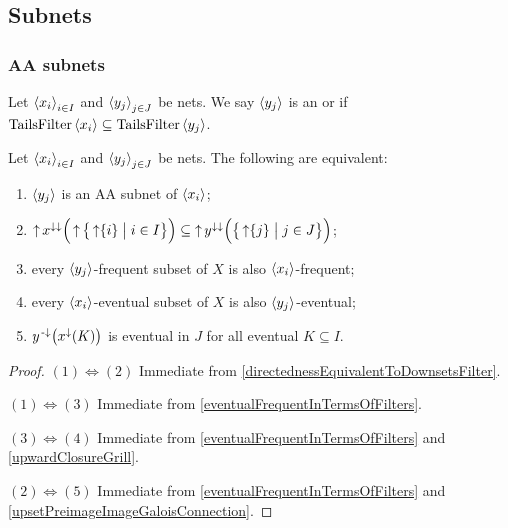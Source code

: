 \subsection{Subnets}
\subsubsection{AA subnets}
\begin{definition}
Let $\left\langle x_i \right\rangle_{i\in I}$ and $\left\langle y_j \right\rangle_{j\in J}$ be nets. We say $\left\langle y_j \right\rangle$ is an  or  if $\operatorname{TailsFilter}\left\langle x_i \right\rangle \subseteq \operatorname{TailsFilter}\left\langle y_j \right\rangle$.
\end{definition}

\begin{lemma} \label{AAsubnetEquivalents}
Let $\left\langle x_i \right\rangle_{i\in I}$ and $\left\langle y_j \right\rangle_{j\in J}$ be nets. The following are equivalent:
\begin{enumerate}
\item $\left\langle y_j \right\rangle$ is an AA subnet of $\left\langle x_i \right\rangle$;
\item $\upset x^{\imf\imf}\Big(\upset\setbuilder[\big]{\upset\{i\}}{i\in I}\Big) \subseteq \upset y^{\imf\imf}\Big(\setbuilder[\big]{\upset\{j\}}{j\in J}\Big)$;
\item every $\left\langle y_j \right\rangle$-frequent subset of $X$ is also $\left\langle x_i \right\rangle$-frequent;
\item every $\left\langle x_i \right\rangle$-eventual subset of $X$ is also $\left\langle y_j \right\rangle$-eventual;
\item $y^{{\text{\hspace{0.15em}-}\downarrow}}\big(x^\downarrow(K)\big)$ is eventual in $J$ for all eventual $K\subseteq I$.
\end{enumerate}
\end{lemma}
\begin{proof}
$(1) \Leftrightarrow (2)$ Immediate from \ref{directednessEquivalentToDownsetsFilter}.

$(1) \Leftrightarrow (3)$ Immediate from \ref{eventualFrequentInTermsOfFilters}.

$(3) \Leftrightarrow (4)$  Immediate from \ref{eventualFrequentInTermsOfFilters} and \ref{upwardClosureGrill}.

$(2) \Leftrightarrow (5)$ Immediate from \ref{eventualFrequentInTermsOfFilters} and \ref{upsetPreimageImageGaloisConnection}.
\end{proof}

